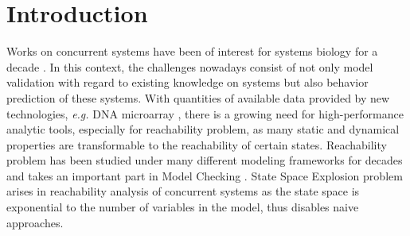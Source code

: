 \documentclass[runningheads]{llncs}
\begin{document}
\section{Introduction}
\label{intro}
Works on concurrent systems have been of interest for systems biology for a decade \cite{bockmayr2002using,bortolussi2008modeling,wiley2003computational}. 
In this context, the challenges nowadays consist of not only model validation with regard to existing knowledge on systems but also behavior prediction of these systems. 
With quantities of available data provided by new technologies, \textit{e.g.} DNA microarray \cite{marx2013}, there is a growing need for high-performance analytic tools, especially for reachability problem, as many static and dynamical properties are transformable to the reachability of certain states.
Reachability problem has been studied under many different modeling frameworks for decades \cite{akutsu2007control,barrett2006complexity,Daws1998,esparza1998,mayr1984,wozna2003} and takes an important part in Model Checking \cite{clarke20142}. 
State Space Explosion problem arises in reachability analysis of concurrent systems as the state space is exponential to the number of variables in the model, thus disables naive approaches. 
\end{document}

